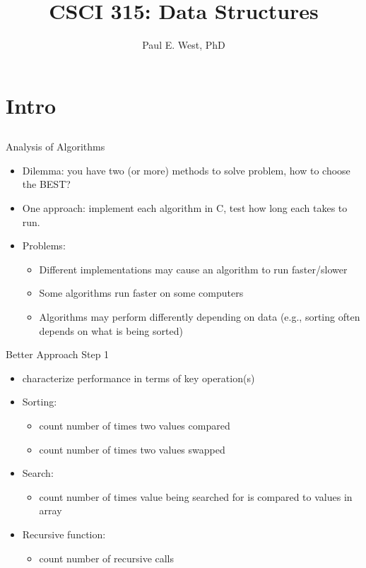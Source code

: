 \documentclass{beamer}
\title{CSCI 315: Data Structures}
\author{Paul E. West, PhD}
\institute{
  Department of Computer Science\\
  Charleston Southern University
}
\begin{document}
\begin{frame}
  \titlepage
\end{frame}

\section{Intro}
\subsection{}
\begin{frame}{Analysis of Algorithms}
\begin{itemize}
\item Dilemma:  you have two (or more) methods to solve problem, how to choose the BEST?
\item One approach: implement each algorithm in C, test how long each takes to run.
\item Problems:
\begin{itemize}
\item Different implementations may cause an algorithm to run faster/slower
\item Some algorithms run faster on some computers
\item Algorithms may perform differently depending on data (e.g., sorting often depends on what is being sorted)
\end{itemize}
\end{itemize}
\end{frame}

\begin{frame}{Better Approach Step 1}
\begin{itemize}
\item characterize performance in terms of key operation(s)
\item Sorting:
\begin{itemize}
\item count number of times two values compared
\item count number of times two values swapped
\end{itemize}
\item Search:
\begin{itemize}
\item count number of times value being searched for is compared to values in array
\end{itemize}
\item Recursive function:
\begin{itemize}
\item count number of recursive calls
\end{itemize}
\end{itemize}
\end{frame}
\end{document}
